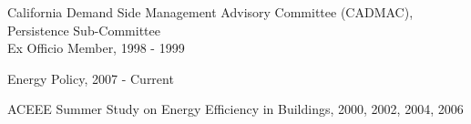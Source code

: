 \documentclass[Computer Science]{vita}
\begin{document}
\begin{vita}
\begin{Professional and Service Activities}
\begin{Community}
    \item California Demand Side Management Advisory Committee (CADMAC), Persistence Sub-Committee\\
      Ex Officio Member, 1998 - 1999

    \end{Community}
    \begin{Journal Article and Paper Review}

    \item Energy Policy, 2007 - Current
    \item ACEEE Summer Study on Energy Efficiency in Buildings, 2000,
      2002, 2004, 2006
  \end{Journal Article and Paper Review}

  \end{Professional and Service Activities}


% 
% 

\end{vita}
\end{document}
